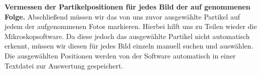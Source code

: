 \textbf{Vermessen der Partikelpositionen für jedes Bild der auf genommenen Folge.} Abschließend müssen wir das von uns zuvor ausgewählte Partikel auf jedem der aufgenommenen Fotos markieren. Hierbei hilft uns zu Teilen wieder die Mikroskopsoftware. Da diese jedoch das ausgewählte Partikel nicht automatisch erkennt, müssen wir diesen für jedes Bild einzeln manuell suchen und auswählen. Die ausgewählten Positionen werden von der Software automatisch in einer Textdatei zur Auswertung gespeichert.